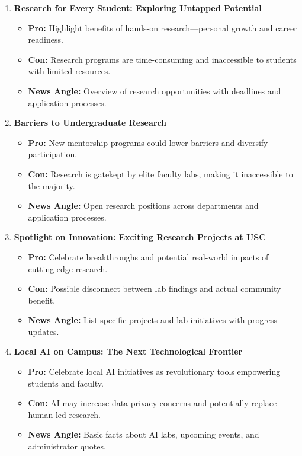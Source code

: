 \documentclass{article}
\begin{document}
\begin{enumerate}[leftmargin=*]
    \item \textbf{Research for Every Student: Exploring Untapped Potential}
    \begin{itemize}
        \item \textbf{Pro:} Highlight benefits of hands-on research---personal growth and career readiness.
        \item \textbf{Con:} Research programs are time-consuming and inaccessible to students with limited resources.
        \item \textbf{News Angle:} Overview of research opportunities with deadlines and application processes.
    \end{itemize}

    \item \textbf{Barriers to Undergraduate Research}
    \begin{itemize}
        \item \textbf{Pro:} New mentorship programs could lower barriers and diversify participation.
        \item \textbf{Con:} Research is gatekept by elite faculty labs, making it inaccessible to the majority.
        \item \textbf{News Angle:} Open research positions across departments and application processes.
    \end{itemize}

    \item \textbf{Spotlight on Innovation: Exciting Research Projects at USC}
    \begin{itemize}
        \item \textbf{Pro:} Celebrate breakthroughs and potential real-world impacts of cutting-edge research.
        \item \textbf{Con:} Possible disconnect between lab findings and actual community benefit.
        \item \textbf{News Angle:} List specific projects and lab initiatives with progress updates.
    \end{itemize}

    \item \textbf{Local AI on Campus: The Next Technological Frontier}
    \begin{itemize}
        \item \textbf{Pro:} Celebrate local AI initiatives as revolutionary tools empowering students and faculty.
        \item \textbf{Con:} AI may increase data privacy concerns and potentially replace human-led research.
        \item \textbf{News Angle:} Basic facts about AI labs, upcoming events, and administrator quotes.
    \end{itemize}


\end{enumerate}
\end{document}
